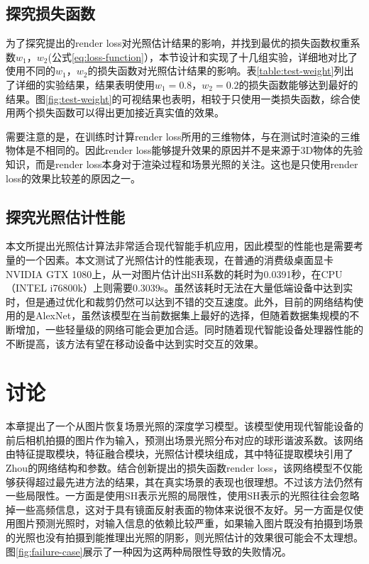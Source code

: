 \subsection{探究损失函数}

为了探究提出的render loss对光照估计结果的影响，并找到最优的损失函数权重系数$w_1$，$w_2$(公式\ref{eq:loss-function}），本节设计和实现了十几组实验，详细地对比了使用不同的$w_1$，$w_2$的损失函数对光照估计结果的影响。表\ref{table:test-weight}列出了详细的实验结果，结果表明使用$w_1=0.8$，$w_2=0.2$的损失函数能够达到最好的结果。图\ref{fig:test-weight}的可视结果也表明，相较于只使用一类损失函数，综合使用两个损失函数可以得出更加接近真实值的效果。



需要注意的是，在训练时计算render loss所用的三维物体，与在测试时渲染的三维物体是不相同的。因此render loss能够提升效果的原因并不是来源于3D物体的先验知识，而是render loss本身对于渲染过程和场景光照的关注。这也是只使用render loss的效果比较差的原因之一。
\subsection{探究光照估计性能}
本文所提出光照估计算法非常适合现代智能手机应用，因此模型的性能也是需要考量的一个因素。本文测试了光照估计的性能表现，在普通的消费级桌面显卡NVIDIA GTX 1080上，从一对图片估计出SH系数的耗时为0.0391秒，在CPU（INTEL i76800k）上则需要0.3039s。虽然该耗时无法在大量低端设备中达到实时，但是通过优化和裁剪仍然可以达到不错的交互速度。此外，目前的网络结构使用的是AlexNet，虽然该模型在当前数据集上最好的选择，但随着数据集规模的不断增加，一些轻量级的网络可能会更加合适。同时随着现代智能设备处理器性能的不断提高，该方法有望在移动设备中达到实时交互的效果。
\section{讨论}
本章提出了一个从图片恢复场景光照的深度学习模型。该模型使用现代智能设备的前后相机拍摄的图片作为输入，预测出场景光照分布对应的球形谐波系数。该网络由特征提取模块，特征融合模块，光照估计模块组成，其中特征提取模块引用了Zhou\cite{zhou2017places}的网络结构和参数。结合创新提出的损失函数render loss，该网络模型不仅能够获得超过最先进方法的结果，其在真实场景的表现也很理想。不过该方法仍然有一些局限性。一方面是使用SH表示光照的局限性，使用SH表示的光照往往会忽略掉一些高频信息，这对于具有镜面反射表面的物体来说很不友好。另一方面是仅使用图片预测光照时，对输入信息的依赖比较严重，如果输入图片既没有拍摄到场景的光照也没有拍摄到能推理出光照的阴影，则光照估计的效果很可能会不太理想。图\ref{fig:failure-case}展示了一种因为这两种局限性导致的失败情况。



